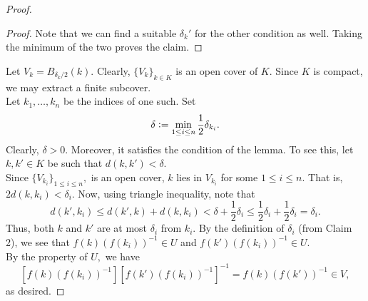\documentclass[12pt]{article}
\theoremstyle{definition}
\numberwithin{thm}{section}
\newenvironment{blockquote}
{\begin{mdframed}[skipabove=0pt, skipbelow=0pt, innertopmargin=4pt, innerbottommargin=4pt, bottomline=false,topline=false,rightline=false, linewidth=2pt]}
{\end{mdframed}}
\begin{document}
\begin{proof}
\begin{blockquote}
\begin{proof}
			Note that we can find a suitable $\delta_k'$ for the other condition as well. Taking the minimum of the two proves the claim.
		\end{proof}
	\end{blockquote}
	Let $V_k = B_{\delta_k/2}(k).$ Clearly, $\{V_k\}_{k \in K}$ is an open cover of $K.$ Since $K$ is compact, we may extract a finite subcover.\\
	Let $k_1, \ldots, k_n$ be the indices of one such. Set 
	\begin{equation*} 
		\delta \vcentcolon= \min_{1 \le i \le n} \dfrac{1}{2}\delta_{k_i}.
	\end{equation*}
	Clearly, $\delta > 0.$ Moreover, it satisfies the condition of the lemma. To see this, let $k, k' \in K$ be such that $d(k, k') < \delta.$\\
	Since $\{V_{k_i}\}_{1 \le i \le n},$ is an open cover, $k$ lies in $V_{k_i}$ for some $1 \le i \le n.$ That is, $2d(k, k_i) < \delta_i.$ Now, using triangle inequality, note that
	\begin{equation*} 
		d(k', k_i) \le d(k', k) + d(k, k_i) < \delta + \frac{1}{2}\delta_i \le \dfrac{1}{2}\delta_i + \dfrac{1}{2}\delta_i = \delta_i.
	\end{equation*}
	Thus, both $k$ and $k'$ are at most $\delta_i$ from $k_i.$ By the definition of $\delta_i$ (from Claim 2), we see that $f(k)(f(k_i))^{-1} \in U$ and $f(k')(f(k_i))^{-1} \in U.$\\
	By the property of $U,$ we have
	\begin{equation*} 
		\left[f(k)(f(k_i))^{-1}\right]\left[f(k')(f(k_i))^{-1}\right]^{-1} = f(k)(f(k'))^{-1} \in V,
	\end{equation*}
	as desired.
\end{proof}
\end{document}
